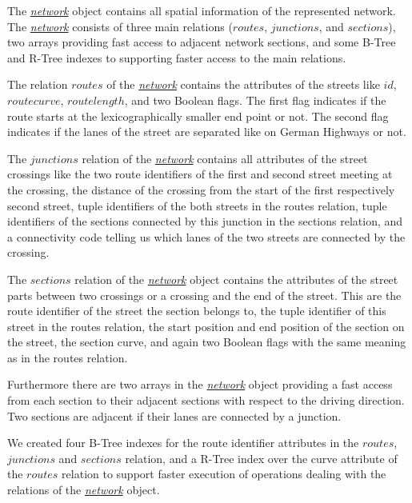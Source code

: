 \documentclass[a4paper]{article}
\newcommand{\dt}[1]{\textsl{\underline{#1}}}
\begin{document}
The \dt{network} object contains all spatial information of the represented network.
The \dt{network} consists of three main relations ($routes$, $junctions$, and $sections$),
two arrays providing fast access to adjacent network sections,
and some B-Tree and R-Tree indexes to supporting faster access to the main relations.

The relation $routes$ of the \dt{network} contains the attributes of the
streets like $id$, $route curve$, $route length$, and two Boolean flags. The first
flag indicates if the route starts at the lexicographically smaller end point or not.
The second flag indicates if the lanes of the street are separated like on German
Highways or not.

The $junctions$ relation of the \dt{network} contains all attributes of the street
crossings like the two route identifiers of the first and second street meeting at the
crossing, the distance of the crossing from the start of the first respectively
second street, tuple identifiers of the both streets in the routes relation,
tuple identifiers of the sections connected by this junction in the sections relation,
and a connectivity code telling us which lanes of the two streets are connected
by the crossing.

The $sections$ relation of the \dt{network} object contains the
attributes of the street parts between two crossings or a crossing and
the end of the street. This are the route identifier of the street the section
belongs to, the tuple identifier of this street in the routes relation, the start
position and end position of the section on the street, the section curve, and
again two Boolean flags with the same meaning as in the routes relation.

Furthermore there are two arrays in the \dt{network} object providing a fast
access from each section to their adjacent sections with respect to the driving
direction. Two sections are adjacent if their lanes are connected by a junction.

We created four B-Tree indexes for the route identifier attributes in the $routes$,
$junctions$ and $sections$ relation, and a R-Tree index over the curve attribute
of the $routes$ relation to support faster execution of operations dealing with
the relations of the \dt{network} object.
\end{document}
